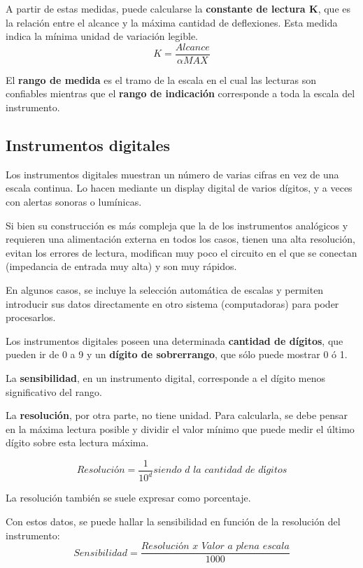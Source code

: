 A partir de estas medidas, puede calcularse la \textbf{constante de lectura K}, que es la relación entre el alcance y la máxima cantidad de deflexiones. Esta medida indica la mínima unidad de variación legible.
$$ K = \frac{Alcance}{\alpha MAX} $$

El \textbf{rango de medida} es el tramo de la escala en el cual las lecturas son confiables mientras que el \textbf{rango de indicación} corresponde a toda la escala del instrumento.

\subsection{Instrumentos digitales}
	
Los instrumentos digitales muestran un número de varias cifras en vez de una escala continua. Lo hacen mediante un display digital de varios dígitos, y a veces con alertas sonoras o lumínicas.

Si bien su construcción es más compleja que la de los instrumentos analógicos y requieren una alimentación externa en todos los casos, tienen una alta resolución, evitan los errores de lectura, modifican muy poco el circuito en el que se conectan (impedancia de entrada muy alta) y son muy rápidos.

En algunos casos, se incluye la selección automática de escalas y permiten introducir sus datos directamente en otro sistema (computadoras) para poder procesarlos.

Los instrumentos digitales poseen una determinada \textbf{cantidad de dígitos}, que pueden ir de 0 a 9 y un \textbf{dígito de sobrerrango}, que sólo puede mostrar 0 ó 1.

La \textbf{sensibilidad}, en un instrumento digital, corresponde a el dígito menos significativo del rango.

La \textbf{resolución}, por otra parte, no tiene unidad. Para calcularla, se debe pensar en la máxima lectura posible y dividir el valor mínimo que puede medir el último dígito sobre esta lectura máxima.

$$ \textit{Resolución} = \frac{1}{10^{d}} \textit{siendo $d$ la cantidad de dígitos}$$

La resolución también se suele expresar como porcentaje.

Con estos datos, se puede hallar la sensibilidad en función de la resolución del instrumento:
$$ Sensibilidad = \frac{\textit{Resolución x Valor a plena escala}}{1000} $$
